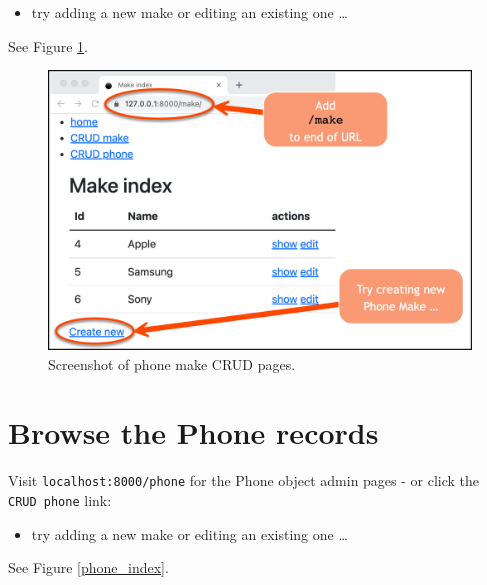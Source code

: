 \documentclass[a4paperpaper,openright]{book}
\providecommand{\tightlist}{%
  \setlength{\itemsep}{0pt}\setlength{\parskip}{0pt}}
\begin{document}
\begin{itemize}
\tightlist
\item
  try adding a new make or editing an existing one \ldots{}
\end{itemize}

See Figure \ref{phone_make}.

\begin{figure}
\centering
\includegraphics[width=1\textwidth,height=\textheight]{./tex2pdf.-564b08cce17d66dc/589be243de6474b6ef708d87dd3912d163d0d387.png}
\caption{Screenshot of phone make CRUD pages.\label{phone_make}}
\end{figure}

\newpage

\hypertarget{browse-the-phone-records}{%
\section{Browse the Phone records}\label{browse-the-phone-records}}

Visit \texttt{localhost:8000/phone} for the Phone object admin pages -
or click the \texttt{CRUD\ phone} link:

\begin{itemize}
\tightlist
\item
  try adding a new make or editing an existing one \ldots{}
\end{itemize}

See Figure \ref{phone_index}.
\end{document}
